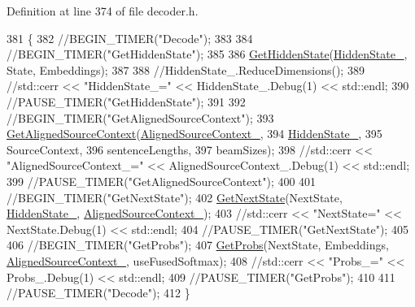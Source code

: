 Definition at line 374 of file decoder.\+h.


\begin{DoxyCode}
381     \{
382       \textcolor{comment}{//BEGIN\_TIMER("Decode");}
383 
384       \textcolor{comment}{//BEGIN\_TIMER("GetHiddenState");}
385 
386       \hyperlink{classamunmt_1_1GPU_1_1Decoder_a947db89d51295ae98c8f36769747faeb}{GetHiddenState}(\hyperlink{classamunmt_1_1GPU_1_1Decoder_a7dde6f55a406e5029deefadb4ec4e721}{HiddenState\_}, State, Embeddings);
387 
388       \textcolor{comment}{//HiddenState\_.ReduceDimensions();}
389       \textcolor{comment}{//std::cerr << "HiddenState\_=" << HiddenState\_.Debug(1) << std::endl;}
390       \textcolor{comment}{//PAUSE\_TIMER("GetHiddenState");}
391 
392       \textcolor{comment}{//BEGIN\_TIMER("GetAlignedSourceContext");}
393       \hyperlink{classamunmt_1_1GPU_1_1Decoder_ad11a95e0d1519604bf1d14a8b33970ca}{GetAlignedSourceContext}(\hyperlink{classamunmt_1_1GPU_1_1Decoder_af5bab1c2275d7e364107d32fb7b0bf88}{AlignedSourceContext\_},
394                               \hyperlink{classamunmt_1_1GPU_1_1Decoder_a7dde6f55a406e5029deefadb4ec4e721}{HiddenState\_},
395                               SourceContext,
396                               sentenceLengths,
397                               beamSizes);
398       \textcolor{comment}{//std::cerr << "AlignedSourceContext\_=" << AlignedSourceContext\_.Debug(1) << std::endl;}
399       \textcolor{comment}{//PAUSE\_TIMER("GetAlignedSourceContext");}
400 
401       \textcolor{comment}{//BEGIN\_TIMER("GetNextState");}
402       \hyperlink{classamunmt_1_1GPU_1_1Decoder_ab3d25eba9931b504c882cf7b3299ae78}{GetNextState}(NextState, \hyperlink{classamunmt_1_1GPU_1_1Decoder_a7dde6f55a406e5029deefadb4ec4e721}{HiddenState\_}, 
      \hyperlink{classamunmt_1_1GPU_1_1Decoder_af5bab1c2275d7e364107d32fb7b0bf88}{AlignedSourceContext\_});
403       \textcolor{comment}{//std::cerr << "NextState=" << NextState.Debug(1) << std::endl;}
404       \textcolor{comment}{//PAUSE\_TIMER("GetNextState");}
405 
406       \textcolor{comment}{//BEGIN\_TIMER("GetProbs");}
407       \hyperlink{classamunmt_1_1GPU_1_1Decoder_a1db9e3d47adbe7d0bc6cb001062f6d69}{GetProbs}(NextState, Embeddings, \hyperlink{classamunmt_1_1GPU_1_1Decoder_af5bab1c2275d7e364107d32fb7b0bf88}{AlignedSourceContext\_}, useFusedSoftmax);
408       \textcolor{comment}{//std::cerr << "Probs\_=" << Probs\_.Debug(1) << std::endl;}
409       \textcolor{comment}{//PAUSE\_TIMER("GetProbs");}
410 
411       \textcolor{comment}{//PAUSE\_TIMER("Decode");}
412     \}
\end{DoxyCode}


